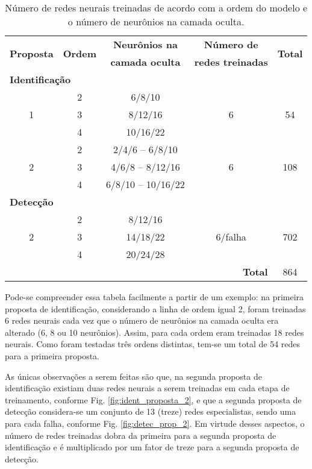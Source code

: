 \begin{table}[htb]
\centering
\caption[Número de redes neurais treinadas]{Número de redes neurais treinadas de
acordo com a ordem do modelo e o número de neurônios na camada oculta.}
\label{tab:treinamentos}
\vspace{0.25cm}
\begin{tabular}{|c|c|c|c|c|}
\hline
\multirow{2}{*}{\bf Proposta} & 
\multirow{2}{*}{\bf Ordem} & 
{\bf Neurônios na} & 
{\bf Número de} & 
\multirow{2}{*}{\bf Total}\\
& & {\bf camada oculta} & {\bf redes treinadas} &\\
\hline
\hline
\multicolumn{5}{|l|}{{\bf Identificação}}\\
\hline
\hline
\multirow{3}{*}{1} & 2 & 6/8/10 & \multirow{3}{*}{6} & \multirow{3}{*}{54}\\
\cline{2-3}
& 3 & 8/12/16 & &\\
\cline{2-3}
& 4 & 10/16/22 & &\\
\hline
\multirow{3}{*}{2} & 2 & 2/4/6 -- 6/8/10 & 
\multirow{3}{*}{6} & \multirow{3}{*}{108}\\
\cline{2-3}
& 3 & 4/6/8 -- 8/12/16 & & \\
\cline{2-3}
& 4 & 6/8/10 -- 10/16/22 & & \\
\hline
\multicolumn{5}{|l|}{{\bf Detecção}}\\
\hline
\hline
\multirow{3}{*}{2} & 2 & 8/12/16 & 
\multirow{3}{*}{6/falha} &
\multirow{3}{*}{702}\\
\cline{2-3}
& 3 & 14/18/22 & &\\
\cline{2-3}
& 4 & 20/24/28 & &\\
\hline
\hline
\multicolumn{4}{|r|}{{\bf Total}} & 864\\
\hline
\end{tabular}
\end{table}

Pode-se compreender essa tabela facilmente a partir de um exemplo: na primeira
proposta de identificação, considerando a linha de ordem igual 2, foram
treinadas 6 redes neurais cada vez que o número de neurônios na camada oculta
era alterado (6, 8 ou 10 neurônios). Assim, para cada ordem eram treinadas 18
redes neurais. Como foram testadas três ordens distintas, tem-se um total de 54
redes para a primeira proposta.

As únicas observações a serem feitas são que, na segunda proposta de
identificação existiam duas redes neurais a serem treinadas em cada etapa de
treinamento, conforme Fig. \ref{fig:ident_proposta_2}, e que a segunda proposta
de detecção considera-se um conjunto de 13 (treze) redes especialistas, sendo
uma para cada falha, conforme Fig. \ref{fig:detec_prop_2}. Em virtude desses
aspectos, o número de redes treinadas dobra da primeira para a segunda proposta
de identificação e é multiplicado por um fator de treze para a segunda proposta
de detecção.

